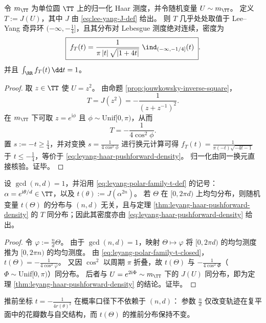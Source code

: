 \begin{theorem}\label{thm:leyang-haar-pushforward-density}
令 \(m_{\TT}\) 为单位圆 \(\TT\) 上的归一化 Haar 测度，并令随机变量 \(U\sim m_{\TT}\)。
定义 \(T:=J(U)\)，其中 \(J\) 由 \eqref{eq:lee-yang-J-def} 给出。
则 \(T\) 几乎处处取值于 Lee--Yang 奇异环 \((-\infty,-\tfrac14]\)，且其分布对 Lebesgue 测度绝对连续，密度为
\begin{equation}\label{eq:leyang-haar-pushforward-density}
\boxed{\;
f_T(t)
=\frac{1}{\pi\,|t|\,\sqrt{|1+4t|}}\;\ind_{(-\infty,-1/4]}(t)\; }.
\end{equation}
并且 \(\int_{\RR} f_T(t)\,\dd t=1\)。
\end{theorem}

\begin{proof}
取 \(z\in\TT\) 使 \(U=z^2\)。
由命题 \ref{prop:jouwkowsky-inverse-square}，
\[
T=J(z^2)=-\frac{1}{(z+z^{-1})^2}.
\]
在 \(m_{\TT}\) 下可取 \(z=e^{\mathrm{i}\phi}\) 且 \(\phi\sim\mathrm{Unif}[0,\pi)\)，从而
\[
T=-\frac{1}{4\cos^2\phi}.
\]
置 \(s:=-t\ge \tfrac14\)，并对变换 \(s=\frac{1}{4\cos^2\phi}\) 进行换元计算可得
\(
f_T(t)=\frac{1}{\pi(-t)\sqrt{-4t-1}}
\)
于 \(t\le -\tfrac14\)，等价于 \eqref{eq:leyang-haar-pushforward-density}。
归一化由同一换元直接核验。证毕。
\end{proof}

\begin{corollary}[余弦极坐标族的推前分布刚性]\label{cor:leyang-polar-family-pushforward-rigidity}
设 \(\gcd(n,d)=1\)，并沿用 \eqref{eq:leyang-polar-family-t-def} 的记号：
\(\alpha=e^{\mathrm{i}\theta/d}\in\TT\)，以及 \(t(\theta):=J(\alpha^{2n})\)。
若 \(\Theta\) 在 \([0,2\pi d)\) 上均匀分布，则随机变量 \(t(\Theta)\) 的分布与 \((n,d)\) 无关，且与定理 \ref{thm:leyang-haar-pushforward-density} 的 \(T\) 同分布；因此其密度亦由 \eqref{eq:leyang-haar-pushforward-density} 给出。
\end{corollary}

\begin{proof}
令 \(\varphi:=\frac{n}{d}\Theta\)。
由于 \(\gcd(n,d)=1\)，映射 \(\Theta\mapsto\varphi\) 将 \([0,2\pi d)\) 的均匀测度推为 \([0,2\pi n)\) 的均匀测度。
由 \eqref{eq:leyang-polar-family-t-closed}，
\(
t(\Theta)=-\frac{1}{4\cos^2\varphi}
\)。
又因 \(\cos^2\) 以周期 \(\pi\) 折叠，故 \(t(\Theta)\) 与 \(-\frac{1}{4\cos^2\Phi}\)（\(\Phi\sim\mathrm{Unif}[0,\pi)\)）同分布。
后者与 \(U=e^{2\mathrm{i}\Phi}\sim m_{\TT}\) 下的 \(J(U)\) 同分布，即为定理 \ref{thm:leyang-haar-pushforward-density} 的结论。证毕。
\end{proof}

\begin{remark}\label{rem:leyang-polar-family-statistical-invariant}
推前坐标 \(t=-\frac{1}{4r(\theta)^2}\) 在概率口径下不依赖于 \((n,d)\)：
参数 \(\frac{n}{d}\) 仅改变轨迹在复平面中的花瓣数与自交结构，而 \(t(\Theta)\) 的推前分布保持不变。
\end{remark}

\endinput
